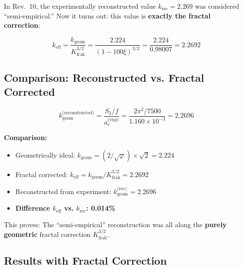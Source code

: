 	In Rev.~10, the experimentally reconstructed value $k_\text{rec} = 2.269$ was considered ``semi-empirical.'' Now it turns out: this value is \textbf{exactly the fractal correction}:
	
	\begin{equation}
		\boxed{k_\text{eff} = \frac{k_\text{geom}}{K_\text{frak}^{3/2}} = \frac{2.224}{(1-100\xi)^{3/2}} = \frac{2.224}{0.98007} = 2.2692}
	\end{equation}
	
	\subsection{Comparison: Reconstructed vs. Fractal Corrected}
	
	\begin{equation}
		k_{\text{geom}}^{\text{(reconstructed)}} = \frac{S_3/f}{a_e^{\text{(exp)}}} = \frac{2\pi^2 / 7500}{1.160 \times 10^{-3}} = 2.2696
	\end{equation}
	
	\textbf{Comparison:}
	\begin{itemize}
		\item Geometrically ideal: $k_{\text{geom}} = (2/\sqrt{\varphi}) \times \sqrt{2} = 2.224$
		\item Fractal corrected: $k_{\text{eff}} = k_{\text{geom}} / K_\text{frak}^{3/2} = 2.2692$
		\item Reconstructed from experiment: $k_{\text{geom}}^{\text{(rec)}} = 2.2696$
		\item \textbf{Difference $k_\text{eff}$ vs. $k_\text{rec}$: 0.014\%}
	\end{itemize}
	
	This proves: The ``semi-empirical'' reconstruction was all along the \textbf{purely geometric} fractal correction $K_\text{frak}^{3/2}$.
	
	\subsection{Results with Fractal Correction}
	
	\begin{table}[h]
		\centering
		\caption{Absolute values with geometric vs. fractal corrected $k_\text{eff}$}
	\end{table}
	
